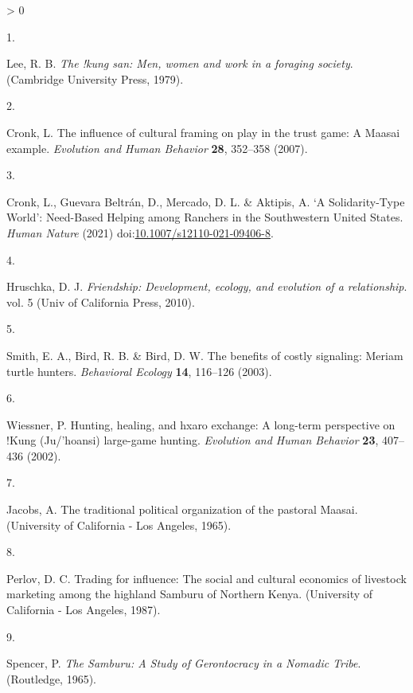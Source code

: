 \documentclass[
]{article}
\newlength{\cslhangindent}
\newlength{\csllabelwidth}
\newenvironment{CSLReferences}[2] %
 {%
  \setlength{\parindent}{0pt}
  \ifodd #1 \everypar{\setlength{\hangindent}{\cslhangindent}}\ignorespaces\fi
  \ifnum #2 > 0
  \setlength{\parskip}{#2\baselineskip}
  \fi
 }%
 {}
\newcommand{\CSLLeftMargin}[1]{\parbox[t]{\csllabelwidth}{#1}}
\newcommand{\CSLRightInline}[1]{\parbox[t]{\linewidth - \csllabelwidth}{#1}\break}
\begin{document}
\hypertarget{refs}{}
\begin{CSLReferences}{0}{0}
\leavevmode\hypertarget{ref-lee1979kung}{}%
\CSLLeftMargin{1. }
\CSLRightInline{Lee, R. B. \emph{The !kung san: Men, women and work in a foraging society}. (Cambridge University Press, 1979).}

\leavevmode\hypertarget{ref-cronkInfluenceCulturalFraming2007}{}%
\CSLLeftMargin{2. }
\CSLRightInline{Cronk, L. The influence of cultural framing on play in the trust game: A {Maasai} example. \emph{Evolution and Human Behavior} \textbf{28}, 352--358 (2007).}

\leavevmode\hypertarget{ref-cronkSolidarityTypeWorldNeedBased2021}{}%
\CSLLeftMargin{3. }
\CSLRightInline{Cronk, L., Guevara Beltrán, D., Mercado, D. L. \& Aktipis, A. {`{A Solidarity}-{Type World}'}: {Need}-{Based Helping} among {Ranchers} in the {Southwestern United States}. \emph{Human Nature} (2021) doi:\href{https://doi.org/10.1007/s12110-021-09406-8}{10.1007/s12110-021-09406-8}.}

\leavevmode\hypertarget{ref-hruschkaFriendshipDevelopmentEcology2010}{}%
\CSLLeftMargin{4. }
\CSLRightInline{Hruschka, D. J. \emph{Friendship: {Development}, ecology, and evolution of a relationship}. vol. 5 ({Univ of California Press}, 2010).}

\leavevmode\hypertarget{ref-smithBenefitsCostlySignaling2003a}{}%
\CSLLeftMargin{5. }
\CSLRightInline{Smith, E. A., Bird, R. B. \& Bird, D. W. The benefits of costly signaling: {Meriam} turtle hunters. \emph{Behavioral Ecology} \textbf{14}, 116--126 (2003).}

\leavevmode\hypertarget{ref-wiessnerHuntingHealingHxaro2002}{}%
\CSLLeftMargin{6. }
\CSLRightInline{Wiessner, P. Hunting, healing, and hxaro exchange: {A} long-term perspective on !{Kung} ({Ju}/'hoansi) large-game hunting. \emph{Evolution and Human Behavior} \textbf{23}, 407--436 (2002).}

\leavevmode\hypertarget{ref-jacobsTraditionalPoliticalOrganization1965}{}%
\CSLLeftMargin{7. }
\CSLRightInline{Jacobs, A. The traditional political organization of the pastoral {Maasai}. (University of California - Los Angeles, 1965).}

\leavevmode\hypertarget{ref-perlovTradingInfluenceSocial1987}{}%
\CSLLeftMargin{8. }
\CSLRightInline{Perlov, D. C. Trading for influence: {The} social and cultural economics of livestock marketing among the highland {Samburu} of {Northern Kenya}. (University of California - Los Angeles, 1987).}

\leavevmode\hypertarget{ref-spencerSamburuStudyGerontocracy1965}{}%
\CSLLeftMargin{9. }
\CSLRightInline{Spencer, P. \emph{The {Samburu}: {A Study} of {Gerontocracy} in a {Nomadic Tribe}}. ({Routledge}, 1965).}


\end{CSLReferences}
\end{document}
